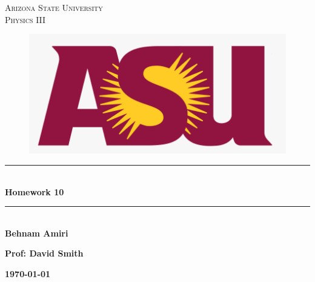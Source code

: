 \documentclass[fleqn]{article}
\begin{document}
  \begin{titlepage}

    \newcommand{\HRule}{\rule{\linewidth}{0.5mm}} %

    \center %
    


    \textsc{\LARGE Arizona State University}\\[1.5cm] %

    \textsc{\LARGE Physics III }\\[1.5cm] %


    \begin{figure}
      \includegraphics[width=\linewidth]{asu.png}
    \end{figure}


    \HRule \\[0.4cm]
    { \huge \bfseries Homework 10}\\[0.4cm] 
    \HRule \\[1.5cm]
    
    \textbf{Behnam Amiri}

    \bigbreak

    \textbf{Prof: David Smith}

    \bigbreak


    \textbf{{\large \today}\\[2cm]}

    \vfill %

  \end{titlepage}
\end{document}

